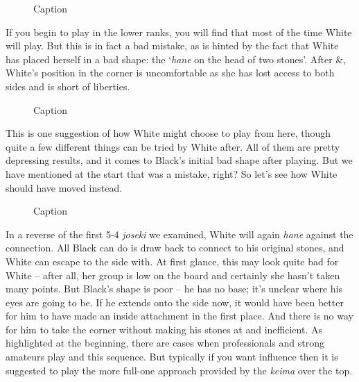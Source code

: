 \documentclass[a5paper,12pt,twoside]{book} %
\newcounter{joseki}                 %
\newcommand{\addstufftotoc}[2][toc]{%
  \addtocontents{#1}{#2}}
\begin{document}
\begin{figure}[!htbp]
 
\vspace{-0.6cm}\caption{Caption}
\label{5-4:outside-2}
\end{figure}

If you begin to play{\large\blackstone[2]} in the lower ranks, you will find that most of the time White will play{\large\whitestone[3]}. But this is in fact a bad mistake, as is hinted by the fact that White has placed herself in a bad shape: the `\textit{hane} on the head of two stones'. After{\large\whitestone[5]} \&{\large\blackstone[6]}, White's position in the corner is uncomfortable as she has lost access to both sides and is short of liberties.\\

\begin{figure}[!htbp]
 
\vspace{-0.6cm}\caption{Caption}
\label{5-4:outside-3}
\end{figure}

This is one suggestion of how White might choose to play from here, though quite a few different things can be tried by White after{\large\blackstone[6]}. All of them are pretty depressing results, and it comes to Black's initial bad shape after playing{\large\whitestone[3]}. But we have mentioned at the start that{\large\whitestone[3]} was a mistake, right? So let's see how White should have moved instead.\\

\begin{figure}[!htbp]
 
\vspace{-0.6cm}\caption{Caption}
\label{5-4:outside-4}
\end{figure}

\addstufftotoc{\nobreak\smallskip\protect\par}

In a reverse of the first 5-4 \textit{joseki} we examined, White will again \textit{hane} against the connection. All Black can do is draw back to connect to his original stones, and White can escape to the side with{\large\whitestone[5]}. At first glance, this may look quite bad for White – after all, her group is low on the board and certainly she hasn't taken many points. But Black's shape is poor – he has no base; it's unclear where his eyes are going to be. If he extends onto the side now, it would have been better for him to have made an inside attachment in the first place. And there is no way for him to take the corner without making his stones at{\large\blackstone[2]} and{\large\blackstone[4]} inefficient. As highlighted at the beginning, there are cases when professionals and strong amateurs play{\large\blackstone[2]} and this sequence. But typically if you want influence then it is suggested to play the more full-one approach provided by the \textit{keima} over the top.\\
\end{document}
